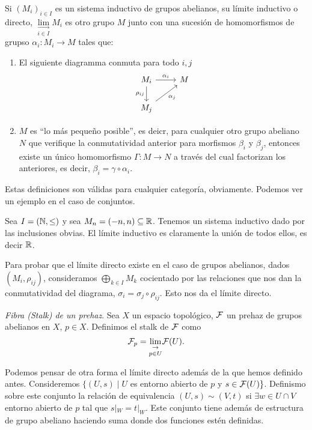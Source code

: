 \documentclass[GA.tex]{subfiles}
\begin{document}
Si $(M_i)_{i\in I}$ es un sistema inductivo de grupos abelianos, su límite inductivo o directo, $\underset{i\in I}{\underset{\rightarrow}{\lim}}M_i$ es otro grupo $M$ junto con una sucesión de homomorfismos de grupso $\alpha_i:M_i\to M$ tales que:
\begin{enumerate}
\item El siguiente diagramma conmuta para todo $i,j$
\[
\begin{tikzcd}
M_i\arrow[r, "\alpha_i"]\arrow[d, "\rho_{ij}"'] & M\\
M_j\arrow[ur, "\alpha_j"'] &
\end{tikzcd}
\]
\item $M$ es ``lo más pequeño posible'', es deicr, para cualquier otro grupo abeliano $N$ que verifique la conmutatividad anterior para morfismos $\beta_i$ y $\beta_j$, entonces existe un único homomorfismo $\Gamma:M\to N$ a través del cual factorizan los anteriores, es decir, $\beta_i=\gamma\circ\alpha_i$. 
\end{enumerate} 

Estas definiciones son válidas para cualquier categoría, obviamente. Podemos ver un ejemplo en el caso de conjuntos. 

\begin{ej}
Sea $I=(\mathbb{N}, \leq)$ y sea $M_n=(-n,n)\subseteq\mathbb{R}$. Tenemos un sistema inductivo dado por las inclusiones obvias. El límite inductivo es claramente la unión de todos ellos, es decir $\mathbb{R}$. 
\end{ej}

Para probar que el límite directo existe en el caso de grupos abelianos, dados $(M_i,\rho_{ij})$, consideramos $\bigoplus_{k\in I}M_k$ cocientado por las relaciones que nos dan la conmutatividad del diagrama, $\sigma_i=\sigma_j\circ \rho_{ij}$. Esto nos da el límite directo.


\begin{defi}
\emph{Fibra (Stalk) de un prehaz}. Sea $X$ un espacio topológico, $\mathcal{F}$ un prehaz de grupos abelianos en $X$, $p\in X$. Definimos el stalk de $\mathcal{F}$ como
\[
\mathcal{F}_p=\underset{p\in U}{\underset{\rightarrow}{\lim}} \mathcal{F}(U).
\]
\end{defi}

Podemos pensar de otra forma el límite directo además de la que hemos definido antes. Consideremos $\{(U,s)\mid U$ es entorno abierto de $p$ y $s\in\mathcal{F}(U)\}$. Definismo sobre este conjunto la relación de equivalencia $(U,s)\sim (V,t)$ si $\exists w\in U\cap V$ entorno abierto de $p$ tal que $s|_W=t|_W$. Este conjunto tiene además de estructura de grupo abeliano haciendo suma donde dos funciones estén definidas. 
\end{document}
